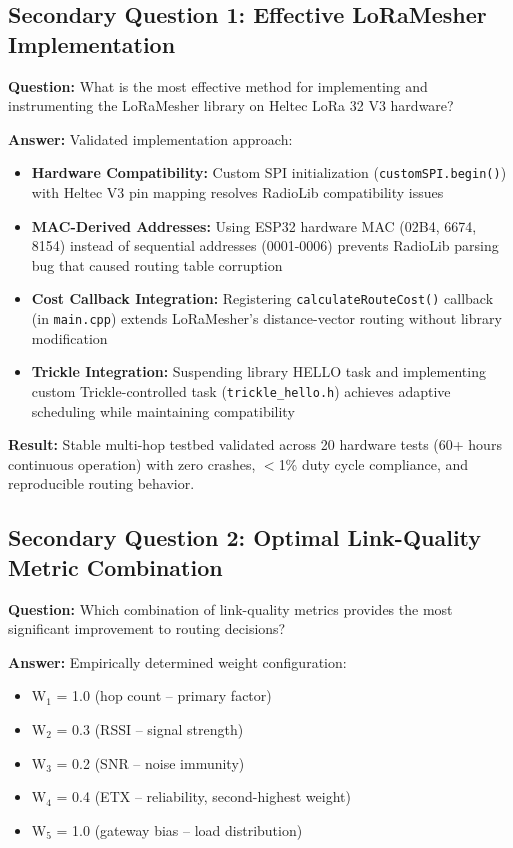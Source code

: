 \subsection{Secondary Question 1: Effective LoRaMesher Implementation}

\textbf{Question:} What is the most effective method for implementing and instrumenting the LoRaMesher library on Heltec LoRa 32 V3 hardware?

\textbf{Answer:} Validated implementation approach:

\begin{itemize}
\item \textbf{Hardware Compatibility:} Custom SPI initialization (\texttt{customSPI.begin()}) with Heltec V3 pin mapping resolves RadioLib compatibility issues
\item \textbf{MAC-Derived Addresses:} Using ESP32 hardware MAC (02B4, 6674, 8154) instead of sequential addresses (0001-0006) prevents RadioLib parsing bug that caused routing table corruption
\item \textbf{Cost Callback Integration:} Registering \texttt{calculateRouteCost()} callback (in \texttt{main.cpp}) extends LoRaMesher's distance-vector routing without library modification
\item \textbf{Trickle Integration:} Suspending library HELLO task and implementing custom Trickle-controlled task (\texttt{trickle\_hello.h}) achieves adaptive scheduling while maintaining compatibility
\end{itemize}

\textbf{Result:} Stable multi-hop testbed validated across 20 hardware tests (60+ hours continuous operation) with zero crashes, $<$1\% duty cycle compliance, and reproducible routing behavior.

\subsection{Secondary Question 2: Optimal Link-Quality Metric Combination}

\textbf{Question:} Which combination of link-quality metrics provides the most significant improvement to routing decisions?

\textbf{Answer:} Empirically determined weight configuration:

\begin{itemize}
\item W$_1$ = 1.0 (hop count -- primary factor)
\item W$_2$ = 0.3 (RSSI -- signal strength)
\item W$_3$ = 0.2 (SNR -- noise immunity)
\item W$_4$ = 0.4 (ETX -- reliability, second-highest weight)
\item W$_5$ = 1.0 (gateway bias -- load distribution)
\end{itemize}

